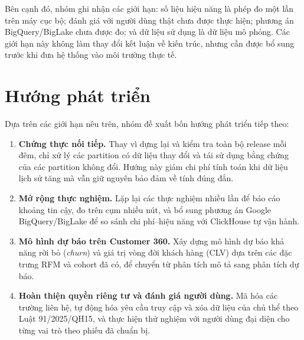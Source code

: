 Bên cạnh đó, nhóm ghi nhận các giới hạn: số liệu hiệu năng là phép đo một lần trên máy cục bộ; đánh giá với người dùng thật chưa được thực hiện; phương án BigQuery/BigLake chưa được đo; và dữ liệu sử dụng là dữ liệu mô phỏng. Các giới hạn này không làm thay đổi kết luận về kiến trúc, nhưng cần được bổ sung trước khi đưa hệ thống vào môi trường thực tế.

\section{Hướng phát triển}
\label{sec:c6-huong-phat-trien}
Dựa trên các giới hạn nêu trên, nhóm đề xuất bốn hướng phát triển tiếp theo:

\begin{enumerate}
    \item \textbf{Chứng thực nối tiếp.} Thay vì dựng lại và kiểm tra toàn bộ release mỗi đêm, chỉ xử lý các partition có dữ liệu thay đổi và tái sử dụng bằng chứng của các partition không đổi. Hướng này giảm chi phí tính toán khi dữ liệu lịch sử tăng mà vẫn giữ nguyên bảo đảm về tính đúng đắn.
    \item \textbf{Mở rộng thực nghiệm.} Lặp lại các thực nghiệm nhiều lần để báo cáo khoảng tin cậy, đo trên cụm nhiều nút, và bổ sung phương án Google BigQuery/BigLake để so sánh chi phí--hiệu năng với ClickHouse tự vận hành.
    \item \textbf{Mô hình dự báo trên Customer 360.} Xây dựng mô hình dự báo khả năng rời bỏ (\emph{churn}) và giá trị vòng đời khách hàng (CLV) dựa trên các đặc trưng RFM và cohort đã có, để chuyển từ phân tích mô tả sang phân tích dự báo.
    \item \textbf{Hoàn thiện quyền riêng tư và đánh giá người dùng.} Mã hóa các trường liên hệ, tự động hóa yêu cầu truy cập và xóa dữ liệu của chủ thể theo Luật 91/2025/QH15, và thực hiện thử nghiệm với người dùng đại diện cho từng vai trò theo phiếu đã chuẩn bị.
\end{enumerate}
